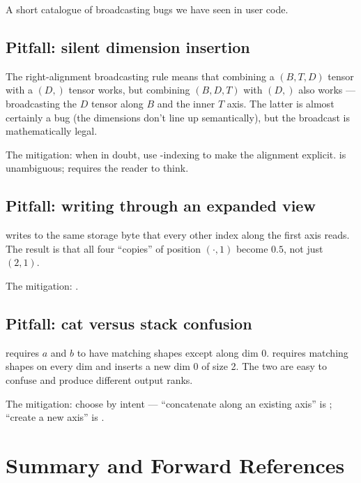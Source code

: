 A short catalogue of broadcasting bugs we have seen in user code.

\subsection{Pitfall: silent dimension insertion}
\label{ssec:shape_view:silent_insert}

The right-alignment broadcasting rule means that combining a
$(B, T, D)$ tensor with a $(D,)$ tensor works, but combining
$(B, D, T)$ with $(D,)$ also works --- broadcasting the $D$ tensor
along $B$ and the inner $T$ axis. The latter is almost certainly a
bug (the dimensions don't line up semantically), but the broadcast
is mathematically legal.

The mitigation: when in doubt, use -indexing to make
the alignment explicit.  is
unambiguous;  requires the reader to think.

\subsection{Pitfall: writing through an expanded view}
\label{ssec:shape_view:expand_write}

 writes to the same storage byte
that every other index along the first axis reads. The result is
that all four ``copies'' of position $(\cdot, 1)$ become $0.5$, not
just $(2, 1)$.

The mitigation: .

\subsection{Pitfall: cat versus stack confusion}
\label{ssec:shape_view:cat_vs_stack}

 requires $a$ and $b$ to have matching
shapes except along dim 0.  requires
matching shapes on every dim and inserts a new dim 0 of size 2.
The two are easy to confuse and produce different output ranks.

The mitigation: choose by intent --- ``concatenate along an existing
axis'' is ; ``create a new axis'' is .

\section{Summary and Forward References}
\label{sec:shape_view:summary}

